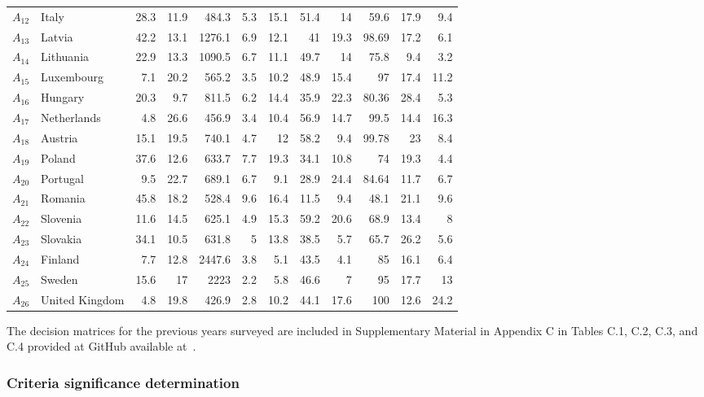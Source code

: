 \documentclass[final,5p,times,twocolumn,authoryear]{elsarticle}
\begin{document}
\begin{table}[ht!]
{\begin{tabular}{llrrrrrrrrrr}
$A_{12}$ & Italy & 28.3 & 11.9 & 484.3 & 5.3 & 15.1 & 51.4 & 14 & 59.6 & 17.9 & 9.4 \\
$A_{13}$ & Latvia & 42.2 & 13.1 & 1276.1 & 6.9 & 12.1 & 41 & 19.3 & 98.69 & 17.2 & 6.1 \\
$A_{14}$ & Lithuania & 22.9 & 13.3 & 1090.5 & 6.7 & 11.1 & 49.7 & 14 & 75.8 & 9.4 & 3.2 \\
$A_{15}$ & Luxembourg & 7.1 & 20.2 & 565.2 & 3.5 & 10.2 & 48.9 & 15.4 & 97 & 17.4 & 11.2 \\
$A_{16}$ & Hungary & 20.3 & 9.7 & 811.5 & 6.2 & 14.4 & 35.9 & 22.3 & 80.36 & 28.4 & 5.3 \\
$A_{17}$ & Netherlands & 4.8 & 26.6 & 456.9 & 3.4 & 10.4 & 56.9 & 14.7 & 99.5 & 14.4 & 16.3 \\
$A_{18}$ & Austria & 15.1 & 19.5 & 740.1 & 4.7 & 12 & 58.2 & 9.4 & 99.78 & 23 & 8.4 \\
$A_{19}$ & Poland & 37.6 & 12.6 & 633.7 & 7.7 & 19.3 & 34.1 & 10.8 & 74 & 19.3 & 4.4 \\
$A_{20}$ & Portugal & 9.5 & 22.7 & 689.1 & 6.7 & 9.1 & 28.9 & 24.4 & 84.64 & 11.7 & 6.7 \\
$A_{21}$ & Romania & 45.8 & 18.2 & 528.4 & 9.6 & 16.4 & 11.5 & 9.4 & 48.1 & 21.1 & 9.6 \\
$A_{22}$ & Slovenia & 11.6 & 14.5 & 625.1 & 4.9 & 15.3 & 59.2 & 20.6 & 68.9 & 13.4 & 8 \\
$A_{23}$ & Slovakia & 34.1 & 10.5 & 631.8 & 5 & 13.8 & 38.5 & 5.7 & 65.7 & 26.2 & 5.6 \\
$A_{24}$ & Finland & 7.7 & 12.8 & 2447.6 & 3.8 & 5.1 & 43.5 & 4.1 & 85 & 16.1 & 6.4 \\
$A_{25}$ & Sweden & 15.6 & 17 & 2223 & 2.2 & 5.8 & 46.6 & 7 & 95 & 17.7 & 13 \\
$A_{26}$ & United Kingdom & 4.8 & 19.8 & 426.9 & 2.8 & 10.2 & 44.1 & 17.6 & 100 & 12.6 & 24.2 \\ \bottomrule
\end{tabular}
}
\end{table}
%
The decision matrices for the previous years surveyed are included in Supplementary Material in Appendix C in Tables C.1, C.2, C.3, and C.4 provided at GitHub available at~\citep{dariagithub2022}.

\subsubsection{Criteria significance determination}
\end{document}
